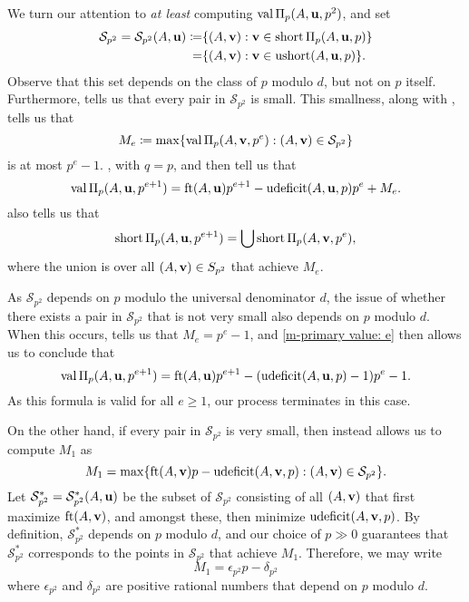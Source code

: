 \documentclass[11pt]{amsart}
\newcommand{\short}{\operatorname{short}}
\newcommand{\ushort}{\operatorname{ushort}}
\newcommand{\udeficit}{\operatorname{udeficit}}
\newcommand{\denom}{d}
\renewcommand{\S}{\mathcal{S}}
\begin{document}
We turn our attention to \emph{at least} computing $\operatorname{val} \Pi_p(A,\mathbf{u},p^2)$, and set
\begin{align*}
 \S_{p^2} = \S_{p^2}(A,\vv{u}) \coloneqq& \{ (A,\vv{v}) : \vv{v} \in \short \IP_{p}(A,\vv{u},p) \} \\
 =& \{ (A,\vv{v}) : \vv{v} \in \ushort(A,\vv{u},p)\}.
\end{align*}  
Observe that this set depends on the class of $p$ modulo $\denom$, but not on $p$ itself.  Furthermore,  tells us that every pair in $\S_{p^2}$ is small.
This smallness, along with , tells us that
\[ M_e \coloneqq \max \{ \val \IP_p(A, \vv{v}, p^e) :  (A,\vv{v}) \in \S_{p^2} \}\]
is at most $p^e-1$.
, with $q=p$, and  then tell us that
%
\begin{equation}
\label{m-primary value: e}
 \val \IP_p(A,\vv{u},p^{e+1}) = \ft{A}{\vv{u}}p^{e+1} - \udeficit(A,\vv{u},p)p^e + M_e.
 \end{equation}
% 
 also tells us that
%
\begin{equation}
\label{m-primary shortfall: e}
\short \IP_p(A,\vv{u},p^{e+1}) = \bigcup \short \IP_p(A,\vv{v}, p^e),
\end{equation}
%
where the union is over all $(A,\vv{v}) \in \mathcal\S_{p^2}$ that achieve $M_e$.

As $\S_{p^2}$ depends on $p$ modulo the universal denominator $\denom$, the issue of whether there exists a pair in $\S_{p^2}$ that is not very small also depends on $p$ modulo $\denom$.  When this occurs,  tells us that $M_e = p^e-1$, and \eqref{m-primary value: e} then allows us to conclude that 
%
\[ \val \IP_p(A,\vv{u},p^{e+1})  = \ft{A}{\vv{u}} p^{e+1}-(\udeficit(A,\vv{u},p)-1)p^e-1.  \]
%
As this formula is valid for all $e \geq 1$, our process terminates in this case.

On the other hand, if every pair in $\S_{p^2}$ is very small, then  instead allows us to compute $M_1$ as 
\[ M_1 = \max \{ \ft{A}{\vv{v}}p-\udeficit(A,\vv{v},p) : (A,\vv{v}) \in \S_{p^2}\}. \] 
Let $\S_{p^2}^{\ast} = \S_{p^2}^{\ast}(A,\vv{u})$ be the subset of $\S_{p^2}$ consisting of all $(A,\mathbf{v})$ that first maximize $\operatorname{ft}(A, \mathbf{v})$, and amongst these, then minimize $\udeficit(A,\vv{v},p)$.
By definition, $\S_{p^2}^{\ast}$ depends on $p$ modulo $\denom$, and our choice of $p \gg 0$ guarantees that $\S_{p^2}^{\ast}$ corresponds to the points in $\S_{p^2}$ that achieve $M_1$.
Therefore, we may write \[ M_1 = \epsilon_{p^2} p - \delta_{p^2}\]  where $\epsilon_{p^2}$ and $\delta_{p^2}$ are positive rational numbers that depend on $p$ modulo $\denom$.
\end{document}
